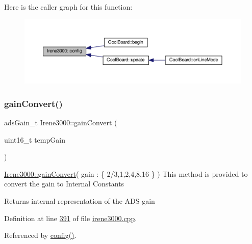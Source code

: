 Here is the caller graph for this function\+:\nopagebreak
\begin{figure}[H]
\begin{center}
\leavevmode
\includegraphics[width=350pt]{class_irene3000_afed5c35e4b23963c157847ef27c11e9c_icgraph}
\end{center}
\end{figure}
\mbox{\label{class_irene3000_abcad62d1201a59f8dd3ba87048002728}} 
\subsubsection{\texorpdfstring{gain\+Convert()}{gainConvert()}}
{\footnotesize\ttfamily ads\+Gain\+\_\+t Irene3000\+::gain\+Convert (\begin{DoxyParamCaption}\item[{uint16\+\_\+t}]{temp\+Gain }\end{DoxyParamCaption})}

\hyperlink{class_irene3000_abcad62d1201a59f8dd3ba87048002728}{Irene3000\+::gain\+Convert}( gain \+: \{ 2/3,1,2,4,8,16 \} ) This method is provided to convert the gain to Internal Constants

\begin{DoxyReturn}{Returns}
internal representation of the A\+DS gain 
\end{DoxyReturn}


Definition at line \hyperlink{irene3000_8cpp_source_l00391}{391} of file \hyperlink{irene3000_8cpp_source}{irene3000.\+cpp}.



Referenced by \hyperlink{irene3000_8cpp_source_l00074}{config()}.


